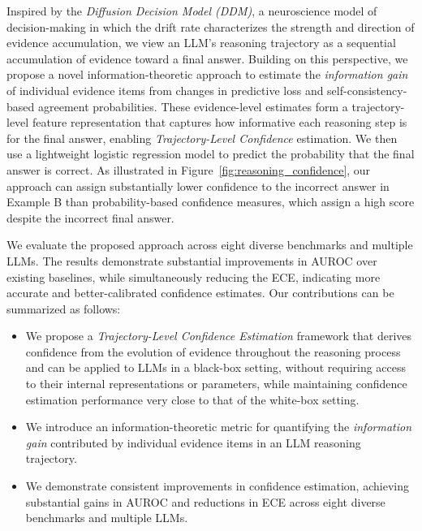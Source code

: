 \documentclass{article} %
\begin{document}
Inspired by the \emph{Diffusion Decision Model (DDM)}, a neuroscience model of decision-making in which the drift rate characterizes the strength and direction of evidence accumulation, we view an LLM's reasoning trajectory as a sequential accumulation of evidence toward a final answer. Building on this perspective, we propose a novel information-theoretic approach to estimate the \emph{information gain} of individual evidence items from changes in predictive loss and self-consistency-based agreement probabilities. These evidence-level estimates form a trajectory-level feature representation that captures how informative each reasoning step is for the final answer, enabling \emph{Trajectory-Level Confidence} estimation. We then use a lightweight logistic regression model to predict the probability that the final answer is correct. As illustrated in Figure~\ref{fig:reasoning_confidence}, our approach can assign substantially lower confidence to the incorrect answer in Example B than probability-based confidence measures, which assign a high score despite the incorrect final answer.

We evaluate the proposed approach across eight diverse benchmarks and multiple LLMs. The results demonstrate substantial improvements in AUROC over existing baselines, while simultaneously reducing the ECE, indicating more accurate and better-calibrated confidence estimates. Our contributions can be summarized as follows:

\begin{itemize}
    \item We propose a \emph{Trajectory-Level Confidence Estimation} framework that derives confidence from the evolution of evidence throughout the reasoning process and can be applied to LLMs in a black-box setting, without requiring access to their internal representations or parameters, while maintaining confidence estimation performance very close to that of the white-box setting.

    \item We introduce an information-theoretic metric for quantifying the \emph{information gain} contributed by individual evidence items in an LLM reasoning trajectory.

    \item We demonstrate consistent improvements in confidence estimation, achieving substantial gains in AUROC and reductions in ECE across eight diverse benchmarks and multiple LLMs.
\end{itemize}
\end{document}

